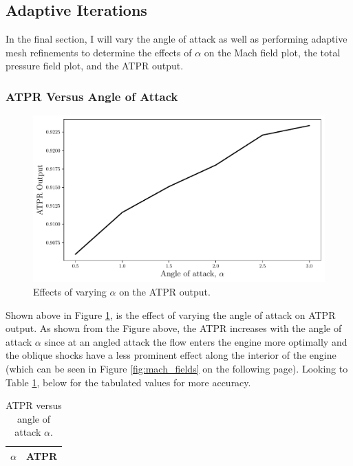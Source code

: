 \pagebreak
\subsection{Adaptive Iterations}

In the final section, I will vary the angle of attack as well as performing adaptive mesh refinements to determine the effects of $\alpha$ on the Mach field plot, the total pressure field plot, and the ATPR output. 

\subsubsection{ATPR Versus Angle of Attack}
\begin{figure}[h]
    \centering
    \includegraphics[width = 0.9\linewidth]{rep/q5/ATPR.pdf}
    \caption[ATPR and Angle of Attack]{Effects of varying $\alpha$ on the ATPR output.}
    \label{fig:aoa_ATPR}
\end{figure}

Shown above in Figure \ref{fig:aoa_ATPR}, is the effect of varying the angle of attack on ATPR output. As shown from the Figure above, the ATPR increases with the angle of attack $\alpha$ since at an angled attack the flow enters the engine more optimally and the oblique shocks have a less prominent effect along the interior of the engine (which can be seen in Figure \ref{fig:mach_fields} on the following page). Looking to Table \ref{tab:ATPR_alpha}, below for the tabulated values for more accuracy.

\begin{table}[h]
    \centering
    \caption[ATPR Versus Angle of Attack]{ATPR versus angle of attack $\alpha$.}
    \label{tab:ATPR_alpha}
    \begin{tabular}{c|l}
        $\alpha$ & ATPR\\ \hline\hline
        
    \end{tabular}
\end{table}


